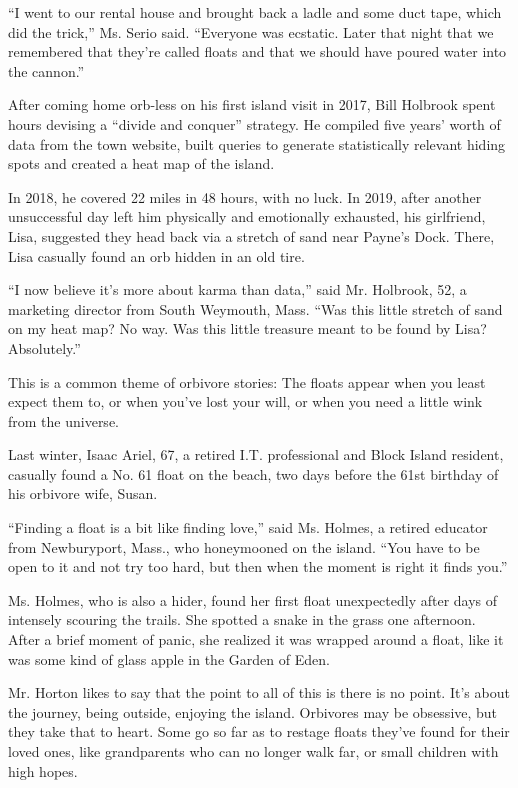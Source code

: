 ``I went to our rental house and brought back a ladle and some duct
tape, which did the trick,'' Ms. Serio said. ``Everyone was ecstatic.
Later that night that we remembered that they're called floats and that
we should have poured water into the cannon.''

After coming home orb-less on his first island visit in 2017, Bill
Holbrook spent hours devising a ``divide and conquer'' strategy. He
compiled five years' worth of data from the town website, built queries
to generate statistically relevant hiding spots and created a heat map
of the island.

In 2018, he covered 22 miles in 48 hours, with no luck. In 2019, after
another unsuccessful day left him physically and emotionally exhausted,
his girlfriend, Lisa, suggested they head back via a stretch of sand
near Payne's Dock. There, Lisa casually found an orb hidden in an old
tire.

``I now believe it's more about karma than data,'' said Mr. Holbrook,
52, a marketing director from South Weymouth, Mass. ``Was this little
stretch of sand on my heat map? No way. Was this little treasure meant
to be found by Lisa? Absolutely.''

This is a common theme of orbivore stories: The floats appear when you
least expect them to, or when you've lost your will, or when you need a
little wink from the universe.

Last winter, Isaac Ariel, 67, a retired I.T. professional and Block
Island resident, casually found a No. 61 float on the beach, two days
before the 61st birthday of his orbivore wife, Susan.

``Finding a float is a bit like finding love,'' said Ms. Holmes, a
retired educator from Newburyport, Mass., who honeymooned on the island.
``You have to be open to it and not try too hard, but then when the
moment is right it finds you.''

Ms. Holmes, who is also a hider, found her first float unexpectedly
after days of intensely scouring the trails. She spotted a snake in the
grass one afternoon. After a brief moment of panic, she realized it was
wrapped around a float, like it was some kind of glass apple in the
Garden of Eden.

Mr. Horton likes to say that the point to all of this is there is no
point. It's about the journey, being outside, enjoying the island.
Orbivores may be obsessive, but they take that to heart. Some go so far
as to restage floats they've found for their loved ones, like
grandparents who can no longer walk far, or small children with high
hopes.

